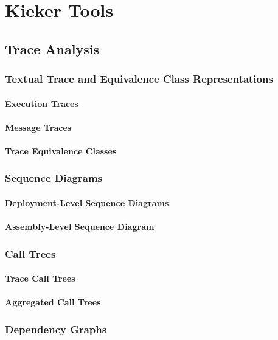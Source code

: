 \chapter{Kieker Tools}\label{chp:Kieker-Tools}
	\section{Trace Analysis}
		\subsection{Textual Trace and Equivalence Class Representations}
			\subsubsection{Execution Traces}
			\subsubsection{Message Traces}
			\subsubsection{Trace Equivalence Classes}
		\subsection{Sequence Diagrams}
			\subsubsection{Deployment-Level Sequence Diagrams}
			\subsubsection{Assembly-Level Sequence Diagram}
		\subsection{Call Trees}
			\subsubsection{Trace Call Trees}
			\subsubsection{Aggregated Call Trees}
		\subsection{Dependency Graphs}
